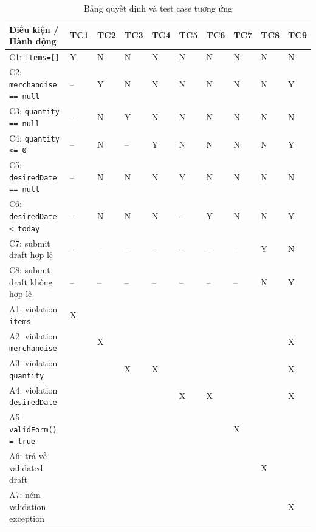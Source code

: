 \documentclass[12pt,a4paper]{article}
\newcommand{\code}[1]{\texttt{#1}}
\begin{document}
\begin{table}[H]
\centering
\small
\begin{tabularx}{\textwidth}{>{\raggedright\arraybackslash}p{}*{9}{>{\centering\arraybackslash}X}}
\toprule
\textbf{Điều kiện / Hành động}
& \textbf{TC1} & \textbf{TC2} & \textbf{TC3}
& \textbf{TC4} & \textbf{TC5} & \textbf{TC6}
& \textbf{TC7} & \textbf{TC8} & \textbf{TC9} \\
\midrule
C1: \code{items=[]}
& Y & N & N & N & N & N & N & N & N \\

C2: \code{merchandise == null}
& -- & Y & N & N & N & N & N & N & Y \\

C3: \code{quantity == null}
& -- & N & Y & N & N & N & N & N & N \\

C4: \code{quantity <= 0}
& -- & N & -- & Y & N & N & N & N & Y \\

C5: \code{desiredDate == null}
& -- & N & N & N & Y & N & N & N & N \\

C6: \code{desiredDate < today}
& -- & N & N & N & -- & Y & N & N & Y \\

C7: submit draft hợp lệ
& -- & -- & -- & -- & -- & -- & -- & Y & N \\

C8: submit draft không hợp lệ
& -- & -- & -- & -- & -- & -- & -- & N & Y \\

\midrule
A1: violation \code{items}
& X &  &  &  &  &  &  &  &  \\

A2: violation \code{merchandise}
&  & X &  &  &  &  &  &  & X \\

A3: violation \code{quantity}
&  &  & X & X &  &  &  &  & X \\

A4: violation \code{desiredDate}
&  &  &  &  & X & X &  &  & X \\

A5: \code{validForm() = true}
&  &  &  &  &  &  & X &  &  \\

A6: trả về validated draft
&  &  &  &  &  &  &  & X &  \\

A7: ném validation exception
&  &  &  &  &  &  &  &  & X \\
\bottomrule
\end{tabularx}
\caption{Bảng quyết định và test case tương ứng}
\end{table}
\end{document}
